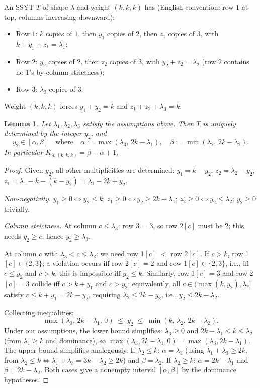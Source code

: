 \documentclass[11pt]{article}
\newtheorem{lemma}[theorem]{Lemma}
\theoremstyle{definition}
\theoremstyle{remark}
\begin{document}
An SSYT $T$ of shape $\lambda$ and weight $(k,k,k)$ has (English convention:
row $1$ at top, columns increasing downward):
\begin{itemize}
    \item Row $1$: $k$ copies of $1$, then $y_1$ copies of $2$, then $z_1$
        copies of $3$, with $k + y_1 + z_1 = \lambda_1$;
    \item Row $2$: $y_2$ copies of $2$, then $z_2$ copies of $3$, with
        $y_2 + z_2 = \lambda_2$ (row $2$ contains no $1$'s by column
        strictness);
    \item Row $3$: $\lambda_3$ copies of $3$.
\end{itemize}
Weight $(k,k,k)$ forces $y_1 + y_2 = k$ and $z_1 + z_2 + \lambda_3 = k$.

\begin{lemma}\label{lem:ssyt-count}
Let $\lambda_1,\lambda_2,\lambda_3$ satisfy the assumptions above. Then $T$
is uniquely determined by the integer $y_2$, and
\[
    y_2 \in [\alpha, \beta]
    \quad\text{where}\quad
    \alpha := \max(\lambda_3,\, 2k-\lambda_1),
    \quad
    \beta := \min(\lambda_2,\, 2k-\lambda_2).
\]
In particular $K_{\lambda,(k,k,k)} = \beta - \alpha + 1$.
\end{lemma}

\begin{proof}
Given $y_2$, all other multiplicities are determined:
$y_1 = k - y_2$, $z_2 = \lambda_2 - y_2$,
$z_1 = \lambda_1 - k - (k - y_2) = \lambda_1 - 2k + y_2$.

\emph{Non-negativity.} $y_1 \ge 0 \Leftrightarrow y_2 \le k$;
$z_1 \ge 0 \Leftrightarrow y_2 \ge 2k - \lambda_1$;
$z_2 \ge 0 \Leftrightarrow y_2 \le \lambda_2$;
$y_2 \ge 0$ trivially.

\emph{Column strictness.} At column $c \le \lambda_3$: row 3 = 3, so row
2$[c]$ must be $2$; this needs $y_2 \ge c$, hence $y_2 \ge \lambda_3$.

At column $c$ with $\lambda_3 < c \le \lambda_2$: we need row 1$[c]$ $<$
row 2$[c]$. If $c > k$, row 1$[c] \in \{2,3\}$; a violation occurs iff row
2$[c] = 2$ and row 1$[c] \in\{2,3\}$, i.e., iff $c \le y_2$ and $c > k$;
this is impossible iff $y_2 \le k$. Similarly, row 1$[c] = 3$ and row
2$[c] = 3$ collide iff $c > k + y_1$ and $c > y_2$; equivalently, all
$c \in (\max(k,y_2), \lambda_2]$ satisfy $c \le k + y_1 = 2k - y_2$,
requiring $\lambda_2 \le 2k - y_2$, i.e., $y_2 \le 2k - \lambda_2$.

Collecting inequalities:
\[
    \max(\lambda_3,\, 2k-\lambda_1,\, 0) \;\le\; y_2 \;\le\;
    \min(k,\, \lambda_2,\, 2k-\lambda_2).
\]
Under our assumptions, the lower bound simplifies: $\lambda_3 \ge 0$ and
$2k - \lambda_1 \le k \le \lambda_2$ (from $\lambda_1 \ge k$ and dominance),
so $\max(\lambda_3, 2k-\lambda_1, 0) = \max(\lambda_3, 2k-\lambda_1)$.
The upper bound simplifies analogously. If $\lambda_2 \le k$: $\alpha =
\lambda_3$ (using $\lambda_1 + \lambda_3 \ge 2k$, from
$\lambda_2 \le k \Leftrightarrow \lambda_1+\lambda_3 = 3k-\lambda_2 \ge 2k$)
and $\beta = \lambda_2$. If $\lambda_2 \ge k$: $\alpha = 2k - \lambda_1$
and $\beta = 2k - \lambda_2$. Both cases give a nonempty interval
$[\alpha,\beta]$ by the dominance hypotheses.
\end{proof}
\end{document}
